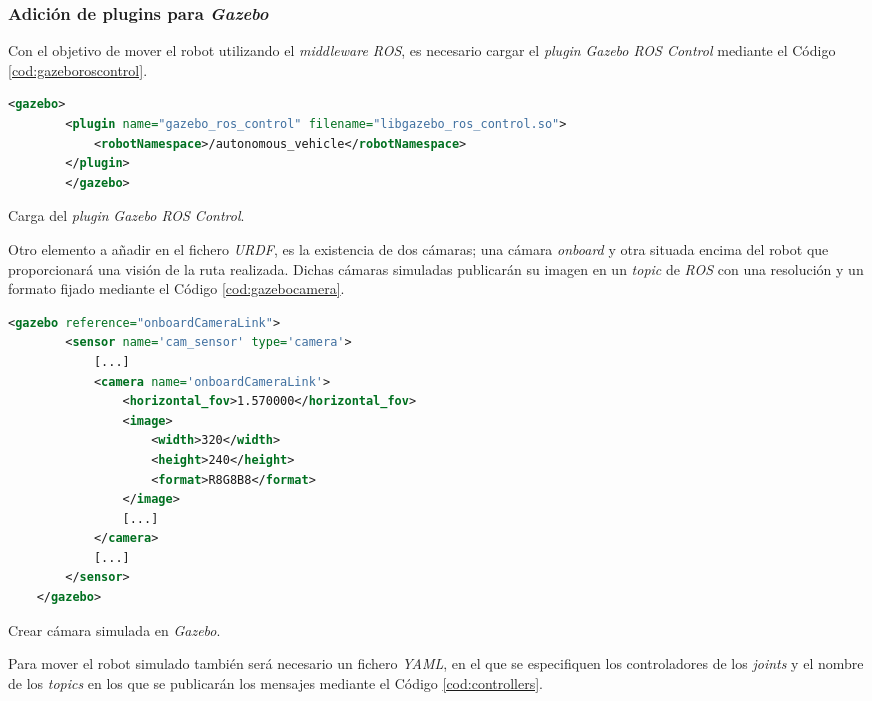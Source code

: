 \subsubsection{Adición de plugins para \textit{Gazebo}}

Con el objetivo de mover el robot utilizando el \textit{middleware ROS}, es necesario cargar el \textit{plugin} \textit{Gazebo ROS Control} mediante el Código
\ref{cod:gazeboroscontrol}.\\

\begin{code}[h]
	\begin{lstlisting}[language=XML]
		<gazebo>
		<plugin name="gazebo_ros_control" filename="libgazebo_ros_control.so">
			<robotNamespace>/autonomous_vehicle</robotNamespace>
		</plugin>
		</gazebo>
	\end{lstlisting}
	\caption[Carga del \textit{plugin} \textit{Gazebo ROS Control}.]{Carga del \textit{plugin} \textit{Gazebo ROS Control}.}
	\label{cod:gazeboroscontrol}
\end{code}

Otro elemento a añadir en el fichero \textit{URDF}, es la existencia de dos cámaras; una cámara \textit{onboard} y otra situada encima del robot que proporcionará una visión de la
ruta realizada. Dichas cámaras simuladas publicarán su imagen en un \textit{topic} de \textit{ROS} con una resolución y un formato fijado mediante el Código
\ref{cod:gazebocamera}.\\

\begin{code}[h]
	\begin{lstlisting}[language=XML]
	<gazebo reference="onboardCameraLink">
		<sensor name='cam_sensor' type='camera'>
			[...]
			<camera name='onboardCameraLink'>
				<horizontal_fov>1.570000</horizontal_fov>
				<image>
					<width>320</width>
					<height>240</height>
					<format>R8G8B8</format>
				</image>
				[...]
			</camera>
			[...]
		</sensor>
	</gazebo>
	\end{lstlisting}
	\caption[Crear cámara simulada en \textit{Gazebo}.]{Crear cámara simulada en \textit{Gazebo}.}
	\label{cod:gazebocamera}
\end{code}

Para mover el robot simulado también será necesario un fichero \textit{YAML}, en el que se especifiquen los controladores de los \textit{joints} y el nombre de los \textit{topics}
en los que se publicarán los mensajes mediante el Código \ref{cod:controllers}.\\

